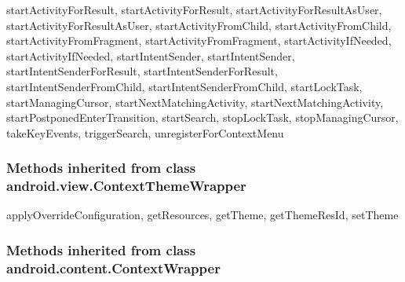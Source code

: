 startActivityForResult, startActivityForResult, startActivityForResultAsUser, startActivityForResultAsUser, startActivityFromChild, startActivityFromChild, startActivityFromFragment, startActivityFromFragment, startActivityIfNeeded, startActivityIfNeeded, startIntentSender, startIntentSender, startIntentSenderForResult, startIntentSenderForResult, startIntentSenderFromChild, startIntentSenderFromChild, startLockTask, startManagingCursor, startNextMatchingActivity, startNextMatchingActivity, startPostponedEnterTransition, startSearch, stopLockTask, stopManagingCursor, takeKeyEvents, triggerSearch, unregisterForContextMenu\\

\subsubsection{Methods inherited from class android.view.ContextThemeWrapper}

applyOverrideConfiguration, getResources, getTheme, getThemeResId, setTheme\\

\subsubsection{Methods inherited from class android.content.ContextWrapper}

